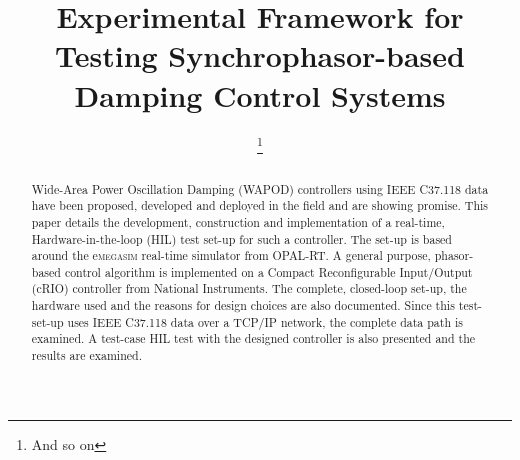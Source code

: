 \documentclass[conference]{IEEEtran}
\begin{document}
\title{Experimental Framework for Testing Synchrophasor-based Damping Control Systems}


\author{
\thanks{And so on}
\and
{}
\and
{}
}

\maketitle
\begin{abstract}

Wide-Area Power Oscillation Damping (WAPOD) controllers using IEEE C37.118 data have been proposed, developed and deployed in the field and are showing promise. This paper details the development, construction and implementation of a real-time, Hardware-in-the-loop (HIL) test set-up for such a controller. The set-up is based around the e\textsc{megasim} real-time simulator from OPAL-RT. A general purpose, phasor-based control algorithm is implemented on a Compact Reconfigurable Input/Output (cRIO) controller from National Instruments. The complete, closed-loop set-up, the hardware used and the reasons for design choices are also documented. Since this test-set-up uses IEEE C37.118 data over a TCP/IP network, the complete data path is examined. A test-case HIL test with the designed controller is also presented and the results are examined.

\end{abstract}

\end{document}
